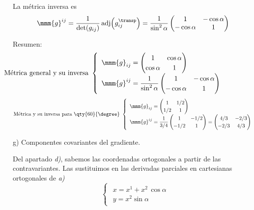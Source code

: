 La métrica inversa es
\begin{align*}
  \mmm{g}^{ij}
  &=
    \dfrac{1}{\det(g_{ij})}\,
    \text{adj}\!\left(g_{ij}^\transp\right)
    = \dfrac{1}{\sin^2\alpha}
    \begin{pmatrix}
      1 & -\cos\alpha\\
      -\cos\alpha & 1
    \end{pmatrix}
\end{align*}

\noindent
Resumen:
\[
  \hspace*{-5.5em}
  \text{Métrica general y su inversa }
  \begin{cases}
    \begin{array}{l}
      \mmm{g}_{ij}
      = \begin{pmatrix}
        1 & \cos\alpha\\
        \cos\alpha & 1
      \end{pmatrix}\\
      \mmm{g}^{ij}
      = \dfrac{1}{\sin^2\alpha}
      \begin{pmatrix}
        1 & -\cos\alpha\\
        -\cos\alpha & 1
      \end{pmatrix}
    \end{array}
  \end{cases}
\]
\[
  \text{Métrica y su inversa para \qty{60}{\degree} }
  \begin{cases}
    \begin{array}{l}
      \mmm{g}_{ij}
      = \begin{pmatrix}
        1 & 1/2\\
        1/2 & 1
      \end{pmatrix}\\
      \mmm{g}^{ij}
      =
      \dfrac{1}{3/4}
      \begin{pmatrix}
        1 & -1/2\\
        -1/2 & 1
      \end{pmatrix}
      = \begin{pmatrix}
        4/3 & -2/3\\
        -2/3 & 4/3
      \end{pmatrix}
    \end{array}
  \end{cases}
\]

\noindent
g) Componentes covariantes del gradiente.

Del apartado \emph{d)}, sabemos las coordenadas ortogonales a partir de las
contravariantes. Las sustituimos en las derivadas parciales en cartesianas ortogonales
de \emph{a)}
\[
  \begin{cases}
    \begin{array}{l}
      x = x^1 + x^2\,\cos\alpha\\
      y = x^2\sin\alpha
    \end{array}
  \end{cases}
\]

